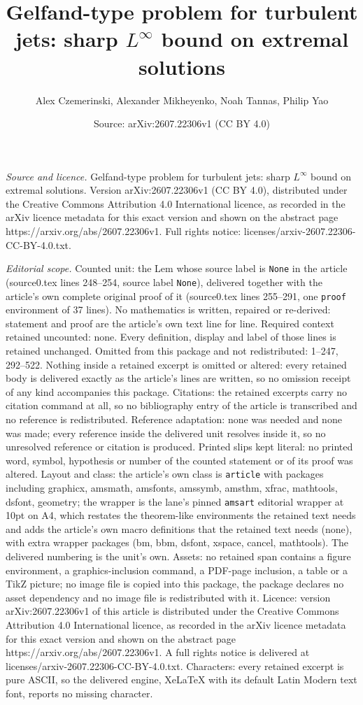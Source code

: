 \documentclass[10pt,a4paper]{amsart}
\title[Gelfand-type problem for turbulent jets: sharp $L^\infty$ bo]{Gelfand-type problem for turbulent jets: sharp $L^\infty$ bound on extremal solutions}
\author{Alex Czemerinski, Alexander Mikheyenko, Noah Tannas, Philip Yao}
\date{Source: arXiv:2607.22306v1 (CC BY 4.0)}
\begin{document}
\maketitle

\noindent\emph{Source and licence.} Gelfand-type problem for turbulent jets: sharp $L^\infty$ bound on extremal solutions. Version arXiv:2607.22306v1 (CC BY 4.0), distributed under the Creative Commons Attribution 4.0 International licence, as recorded in the arXiv licence metadata for this exact version and shown on the abstract page https://arxiv.org/abs/2607.22306v1. Full rights notice: licenses/arxiv-2607.22306-CC-BY-4.0.txt.\par\smallskip

\noindent\textit{Editorial scope.} Counted unit: the Lem whose source label is \texttt{None} in the article (source0.tex lines 248--254, source label \texttt{None}), delivered together with the article's own complete original proof of it (source0.tex lines 255--291, one \texttt{proof} environment of 37 lines). No mathematics is written, repaired or re-derived: statement and proof are the article's own text line for line. Required context retained uncounted: none. Every definition, display and label of those lines is retained unchanged. Omitted from this package and not redistributed: 1--247, 292--522. Nothing inside a retained excerpt is omitted or altered: every retained body is delivered exactly as the article's lines are written, so no omission receipt of any kind accompanies this package. Citations: the retained excerpts carry no citation command at all, so no bibliography entry of the article is transcribed and no reference is redistributed. Reference adaptation: none was needed and none was made; every reference inside the delivered unit resolves inside it, so no unresolved reference or citation is produced. Printed slips kept literal: no printed word, symbol, hypothesis or number of the counted statement or of its proof was altered. Layout and class: the article's own class is \texttt{article} with packages including graphicx, amsmath, amsfonts, amssymb, amsthm, xfrac, mathtools, dsfont, geometry; the wrapper is the lane's pinned \texttt{amsart} editorial wrapper at 10pt on A4, which restates the theorem-like environments the retained text needs and adds the article's own macro definitions that the retained text needs (none), with extra wrapper packages (bm, bbm, dsfont, xspace, cancel, mathtools). The delivered numbering is the unit's own. Assets: no retained span contains a figure environment, a graphics-inclusion command, a PDF-page inclusion, a table or a TikZ picture; no image file is copied into this package, the package declares no asset dependency and no image file is redistributed with it. Licence: version arXiv:2607.22306v1 of this article is distributed under the Creative Commons Attribution 4.0 International licence, as recorded in the arXiv licence metadata for this exact version and shown on the abstract page https://arxiv.org/abs/2607.22306v1. A full rights notice is delivered at licenses/arxiv-2607.22306-CC-BY-4.0.txt. Characters: every retained excerpt is pure ASCII, so the delivered engine, XeLaTeX with its default Latin Modern text font, reports no missing character.
\end{document}
